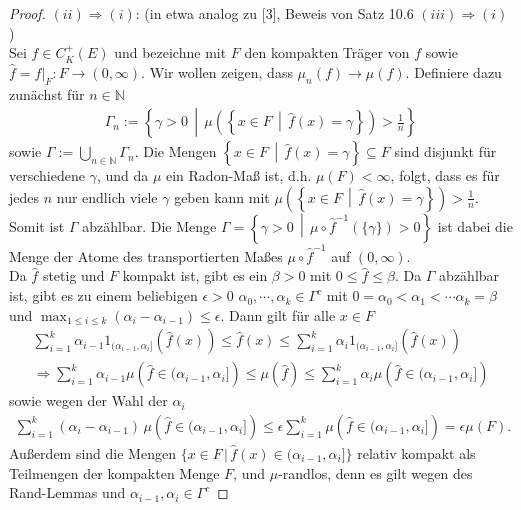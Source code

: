 \documentclass[twoside]{article}
\theoremstyle{definition}
\begin{document}
\begin{proof}
$(ii) \Longrightarrow (i)$: (in etwa analog zu [3], Beweis von Satz 10.6 $(iii) \Longrightarrow (i)$)\\
Sei $f \in C_K^+(E)$ und bezeichne mit $F$ den kompakten Träger von $f$ sowie $\hat{f}= f |_F:F \to (0,\infty)$. Wir wollen zeigen, dass $\mu_n(f) \to \mu(f)$. Definiere dazu zunächst für $n \in \mathbb{N}$
\begin{align}
\Gamma_n := \left\{\gamma > 0 \, \middle| \, \mu\left(\left\{x \in F \, \middle| \, \hat{f}(x) = \gamma \right\} \right) > \frac{1}{n} \right\}
\end{align}
sowie $\Gamma := \bigcup_{n \in \mathbb{N}} \Gamma_n$. Die Mengen $\left\{x \in F \, \middle| \, \hat{f}(x) = \gamma \right\} \subseteq F$ sind disjunkt für verschiedene $\gamma$, und da $\mu$ ein Radon-Maß ist, d.h. $\mu(F) < \infty$, folgt, dass es für jedes $n$ nur endlich viele $\gamma$ geben kann mit $\mu\left(\left\{x \in F \, \middle| \, \hat{f}(x) = \gamma \right\} \right) > \frac{1}{n}$. Somit ist $\Gamma$ abzählbar. Die Menge $\Gamma = \left\{ \gamma > 0 \, \middle| \, \mu \circ \hat{f}^{-1}(\{\gamma\})>0 \right\}$ ist dabei die Menge der Atome des transportierten Maßes $\mu \circ \hat{f}^{-1}$ auf $(0,\infty)$.\\
Da $\hat{f}$ stetig und $F$ kompakt ist, gibt es ein $\beta > 0$ mit $0 \leq \hat{f} \leq \beta$. Da $\Gamma$ abzählbar ist, gibt es zu einem beliebigen $\epsilon > 0$ $\alpha_0 , \cdots , \alpha_k \in \Gamma^c$ mit $0 = \alpha_0 < \alpha_1 < \cdots \alpha_k = \beta$ und $\max_{1 \leq i \leq k} (\alpha_i - \alpha_{i-1}) \leq \epsilon$. Dann gilt für alle $x \in F$
\begin{align}
\sum_{i=1}^k \alpha_{i-1} 1_{(\alpha_{i-1},\alpha_i]}\left(\hat{f}(x) \right) \leq \hat{f}(x) \leq \sum_{i=1}^k \alpha_{i} 1_{(\alpha_{i-1},\alpha_i]}\left(\hat{f}(x) \right) \label{eq:indikatorineq}\\
\Longrightarrow \sum_{i=1}^k \alpha_{i-1} \mu\left( \hat{f} \in (\alpha_{i-1},\alpha_i]\right) \leq \mu(\hat{f}) \leq \sum_{i=1}^k \alpha_{i} \mu\left( \hat{f} \in (\alpha_{i-1},\alpha_i]\right) \label{eq:muineq}
\end{align}
sowie wegen der Wahl der $\alpha_i$
\begin{align}
\sum_{i=1}^k (\alpha_i - \alpha_{i-1})\,\mu\left( \hat{f} \in (\alpha_{i-1},\alpha_i]\right) \leq \epsilon \sum_{i=1}^k \mu\left( \hat{f} \in (\alpha_{i-1},\alpha_i]\right) = \epsilon \mu(F). \label{maximalineq}
\end{align}
Außerdem sind die Mengen $\{x \in F \, | \, \hat{f}(x) \in (\alpha_{i-1},\alpha_i] \}$ relativ kompakt als Teilmengen der kompakten Menge $F$, und $\mu$-randlos, denn es gilt wegen des Rand-Lemmas  und $\alpha_{i-1},\alpha_i \in \Gamma^c$

\end{proof}
\end{document}
